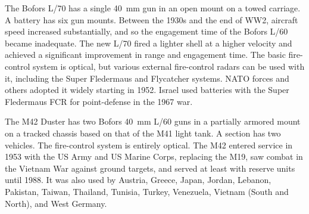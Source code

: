 The Bofors L/70 has a single 40~mm gun in an open mount on a towed carriage.
A battery has six gun mounts.
Between the 1930s and the end of WW2, aircraft speed increased substantially, and so the engagement time of the Bofors L/60 became inadequate. The new L/70 fired a lighter shell at a higher velocity and achieved a significant improvement in range and engagement time. The basic fire-control system is optical, but various external fire-control radars can be used with it, including the Super Fledermaus and Flycatcher systems.
NATO forces and others adopted it widely starting in 1952. Israel used batteries with the Super Fledermaus FCR for point-defense in the 1967 war.%


The M42 Duster has two Bofors 40~mm L/60 guns in a partially armored mount on a tracked chassis based on that of the M41 light tank.
A section has two vehicles.
The fire-control system is entirely optical.
The M42 entered service in 1953 with the US Army and US Marine Corps, replacing the M19, saw combat in the Vietnam War against ground targets, and served at least with reserve units until 1988. It was also used by Austria, Greece, Japan, Jordan, Lebanon, Pakistan, Taiwan, Thailand, Tunisia, Turkey, Venezuela, Vietnam (South and North), and West Germany.%


